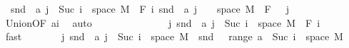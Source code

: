 \begin{isabellebody}
\ {\isacharasterisk}{\kern0pt}{\isacharcolon}{\kern0pt}\ {\isachardoublequoteopen}snd\ {\isacharbackquote}{\kern0pt}\ {\isacharparenleft}{\kern0pt}a\ j\ {\isasyminter}\ {\isacharparenleft}{\kern0pt}{\isacharbraceleft}{\kern0pt}Suc\ i{\isacharbraceright}{\kern0pt}\ {\isasymtimes}\ space\ M{\isacharparenright}{\kern0pt}{\isacharparenright}{\kern0pt}\ {\isasymin}\ F\ i{\isachardoublequoteclose}\ {\isachardoublequoteopen}snd\ {\isacharbackquote}{\kern0pt}\ {\isacharparenleft}{\kern0pt}a\ j\ {\isasyminter}\ {\isacharparenleft}{\kern0pt}{\isacharbraceleft}{\kern0pt}{}{\isacharbraceright}{\kern0pt}\ {\isasymtimes}\ space\ M{\isacharparenright}{\kern0pt}{\isacharparenright}{\kern0pt}\ {\isasymin}\ F\ {}{\isachardoublequoteclose}\ \ j\ \isamarkupfalse%
\ Union{\isacharparenleft}{\kern0pt}{}{\isacharcomma}{\kern0pt}{}{\isacharparenright}{\kern0pt}{\isacharbrackleft}{\kern0pt}OF\ a{\isacharunderscore}{\kern0pt}i{\isacharbrackright}{\kern0pt}\ \isamarkupfalse%
\ auto\isanewline
\ \ \isacommand{{\isacharbraceleft}{\kern0pt}}\isamarkupfalse%
\isanewline
\ \ \ \ \isamarkupfalse%
\ {}\isanewline
\ \ \ \ \isamarkupfalse%
\ {\isachardoublequoteopen}{\isacharparenleft}{\kern0pt}{\isasymUnion}j{\isachardot}{\kern0pt}\ snd\ {\isacharbackquote}{\kern0pt}\ {\isacharparenleft}{\kern0pt}a\ j\ {\isasyminter}\ {\isacharparenleft}{\kern0pt}{\isacharbraceleft}{\kern0pt}Suc\ i{\isacharbraceright}{\kern0pt}\ {\isasymtimes}\ space\ M{\isacharparenright}{\kern0pt}{\isacharparenright}{\kern0pt}{\isacharparenright}{\kern0pt}\ {\isasymin}\ F\ i{\isachardoublequoteclose}\ \isamarkupfalse%
\ {\isacharasterisk}{\kern0pt}\ \isamarkupfalse%
\ fast\isanewline
\ \ \ \ \isamarkupfalse%
\ \isamarkupfalse%
\ {\isachardoublequoteopen}{\isacharparenleft}{\kern0pt}{\isasymUnion}j{\isachardot}{\kern0pt}\ snd\ {\isacharbackquote}{\kern0pt}\ {\isacharparenleft}{\kern0pt}a\ j\ {\isasyminter}\ {\isacharparenleft}{\kern0pt}{\isacharbraceleft}{\kern0pt}Suc\ i{\isacharbraceright}{\kern0pt}\ {\isasymtimes}\ space\ M{\isacharparenright}{\kern0pt}{\isacharparenright}{\kern0pt}{\isacharparenright}{\kern0pt}\ {\isacharequal}{\kern0pt}\ snd\ {\isacharbackquote}{\kern0pt}\ {\isacharparenleft}{\kern0pt}{\isasymUnion}\ {\isacharparenleft}{\kern0pt}range\ a{\isacharparenright}{\kern0pt}\ {\isasyminter}\ {\isacharparenleft}{\kern0pt}{\isacharbraceleft}{\kern0pt}Suc\ i{\isacharbraceright}{\kern0pt}\ {\isasymtimes}\ space\ M{\isacharparenright}{\kern0pt}{\isacharparenright}{\kern0pt}{\isachardoublequoteclose}\ \isamarkupfalse%

\end{isabellebody}
